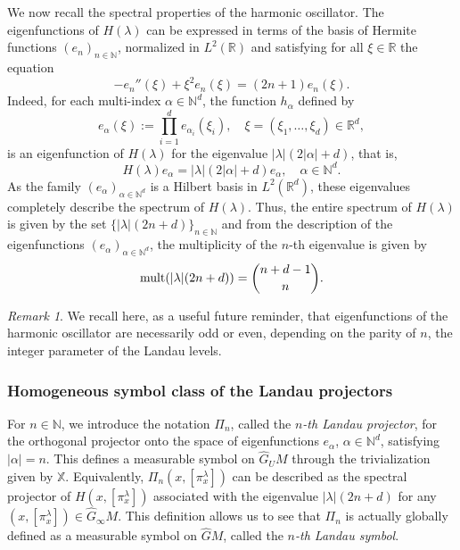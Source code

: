\documentclass[12pt,a4paper]{amsart}
\theoremstyle{plain}
\theoremstyle{definition}
\theoremstyle{remark}
\newtheorem{remark}[theorem]{Remark}
\numberwithin{equation}{section}
\theoremstyle{definition}
\def\R{{\mathbb R}}%
\def\N{{\mathbb N}}%
\def \bX{\mathbb{X}}
\def \Ghat{\widehat{G}}
\numberwithin{equation}{section}
\begin{document}
We now recall the spectral properties of the harmonic oscillator. The eigenfunctions of $H(\lambda)$ can be expressed in terms of the basis of Hermite functions $(e_n)_{n\in\N}$, normalized
in $L^2(\R)$ and satisfying for all $\xi\in\R$ the equation
\begin{equation*}
    -e_{n}''(\xi) + \xi^2 e_n(\xi)  = (2n+1)e_n(\xi).
\end{equation*}
Indeed, for each multi-index $\alpha\in\N^d$, the function $h_\alpha$ defined by
\begin{equation*}
    e_\alpha(\xi) := \prod_{i=1}^d e_{\alpha_i}(\xi_i),\quad \xi = (\xi_1,\dots,\xi_d)\in\R^d,
\end{equation*}
is an eigenfunction of $H(\lambda)$ for the eigenvalue $|\lambda|(2|\alpha|+d)$, that is,
\begin{equation*}
    H(\lambda)e_\alpha = |\lambda|(2|\alpha|+d)e_\alpha,\quad \alpha\in\N^d.
\end{equation*}
As the family $(e_\alpha)_{\alpha\in\N^d}$ is a Hilbert basis in $L^2(\R^d)$, these eigenvalues completely describe the spectrum of $H(\lambda)$. Thus, the entire spectrum of $H(\lambda)$ is given by the set $\{|\lambda|(2n+d)\}_{n\in\N}$ and from the description of the eigenfunctions $(e_\alpha)_{\alpha\in\N^d}$, the multiplicity of the $n$-th eigenvalue is given by
\begin{equation}
    \label{eq:multiplicity}
    {\rm mult}(|\lambda|(2n+d)) = \binom{n+d-1}{n}.
\end{equation}

\begin{remark}
    \label{rem:oddeven}
    We recall here, as a useful future reminder, that eigenfunctions of the harmonic oscillator are necessarily odd or even, depending on the parity of $n$, the integer parameter of the Landau levels.
\end{remark}

\subsubsection{Homogeneous symbol class of the Landau projectors}

For $n\in \N$, we introduce the notation $\Pi_n$, called the \emph{$n$-th Landau projector}, for the orthogonal projector onto the space of eigenfunctions $e_\alpha$, $\alpha\in\N^d$, satisfying $|\alpha| = n$. This defines a measurable symbol on $\Ghat_U M$ through the trivialization given by $\bX$. Equivalently, $\Pi_n(x,[\pi_x^\lambda])$ can be described as the spectral projector of $H(x,[\pi_x^\lambda])$ associated with the eigenvalue $|\lambda|(2n+d)$ for any $(x,[\pi_x^\lambda]) \in \Ghat_\infty M$. This definition allows us to see that $\Pi_n$ is actually globally defined as a measurable symbol on $\Ghat M$, called the \emph{$n$-th Landau symbol}. 
\end{document}
